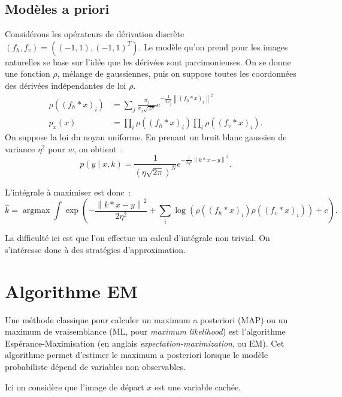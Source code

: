 \documentclass[french,a4paper]{article}
\theoremstyle{plain}
\theoremstyle{definition}
\theoremstyle{remark}
\DeclareMathOperator*{\argmax}{argmax}
\newcommand{\norm}[1]{\left\lVert #1 \right\rVert}
\begin{document}
\subsection{Modèles a priori}

Considérons les opérateurs de dérivation discrète $(f_h,f_v) = ((-1,1),(-1,1)^T)$. Le modèle qu'on prend pour les images naturelles se base sur l'idée que les dérivées sont parcimonieuses. On se donne une fonction $\rho$, mélange de gaussiennes, puis on suppose toutes les coordonnées des dérivées indépendantes de loi $\rho$.
\begin{align*}
\rho((f_h*x)_i) &= \sum_j \frac{\pi_j}{\sigma_j \sqrt{2\pi}}e^{-\frac{1}{2\sigma_j^2}\norm{(f_h*x)_i}^2} \\
p_x(x) &= \prod_i \rho\left((f_h*x)_i \right) \prod_i \rho\left((f_v*x)_i\right) .
\end{align*}
On suppose la loi du noyau uniforme. En prenant un bruit blanc gaussien de variance $\eta^2$ pour $w$, on obtient~:
\[
p(y\mid x,k) = \frac{1}{(\eta\sqrt{2\pi})^N} e^{-\frac{1}{2\eta^2}\norm{k*x-y}^2} .
\]

L'intégrale à maximiser est donc~:
\[
\hat{k} = \argmax \int \exp\left( - \frac{\norm{k*x-y}^2}{2\eta^2} +  \sum_i \log\left(\rho((f_h*x)_i)\rho((f_v*x)_i)\right)  + c \right) .
\]

La difficulté ici est que l'on effectue un calcul d'intégrale non trivial. On s'intéresse donc à des stratégies d'approximation.

\section{Algorithme EM}
Une méthode classique pour calculer un maximum a posteriori (MAP) ou un maximum de vraisemblance (ML, pour \textit{maximum likelihood}) est l'algorithme Espérance-Maximisation (en anglais \textit{expectation-maximization}, ou EM). Cet algorithme permet d'estimer le maximum a posteriori lorsque le modèle probabiliste dépend de variables non observables.

Ici on considère que l'image de départ $x$ est une variable cachée. 
\end{document}
